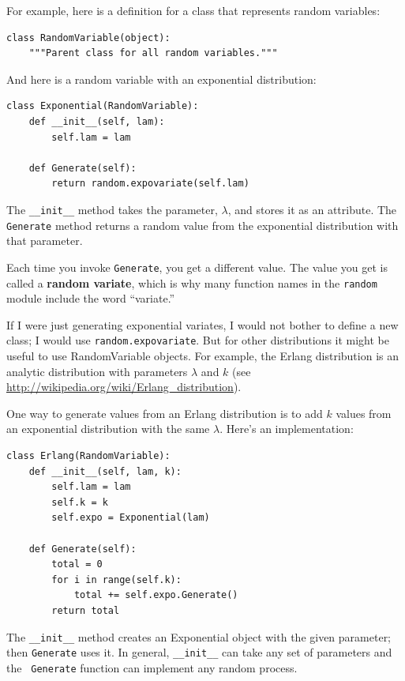 \documentclass[12pt]{book}
\begin{document}
For example, here is a definition for a class that represents
random variables:
%
\begin{verbatim}
class RandomVariable(object):
    """Parent class for all random variables."""
\end{verbatim}

And here is a random variable with an exponential distribution:
%
\begin{verbatim}
class Exponential(RandomVariable):
    def __init__(self, lam):
        self.lam = lam

    def Generate(self):
        return random.expovariate(self.lam)
\end{verbatim}

The \verb"__init__" method takes the parameter, $\lambda$, and stores
it as an attribute.  The {\tt Generate} method returns a random value
from the exponential distribution with that parameter.   

Each time you invoke {\tt Generate}, you get a different value.  The
value you get is called a {\bf random variate}, which is why many
function names in the {\tt random} module include the word ``variate.''

If I were just generating exponential variates, I would not bother to
define a new class; I would use {\tt random.expovariate}.  But for
other distributions it might be useful to use RandomVariable objects.
For example, the Erlang distribution is an analytic distribution with
parameters $\lambda$ and $k$ (see
\url{http://wikipedia.org/wiki/Erlang_distribution}).

One way to generate values from an Erlang distribution is to add
$k$ values from an exponential distribution with the same $\lambda$.
Here's an implementation:
%
\begin{verbatim}
class Erlang(RandomVariable):
    def __init__(self, lam, k):
        self.lam = lam
        self.k = k
        self.expo = Exponential(lam)

    def Generate(self):
        total = 0
        for i in range(self.k):
            total += self.expo.Generate()
        return total
\end{verbatim}

The \verb"__init__" method creates an Exponential object with the
given parameter; then {\tt Generate} uses it.  In general,
\verb"__init__" can take any set of parameters and the {\tt
  Generate} function can implement any random process.
\end{document}
